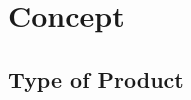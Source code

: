 \documentclass{scrartcl}
\begin{document}







\section{Concept}\label{concept}

\subsection*{Type of Product}

\end{document}
